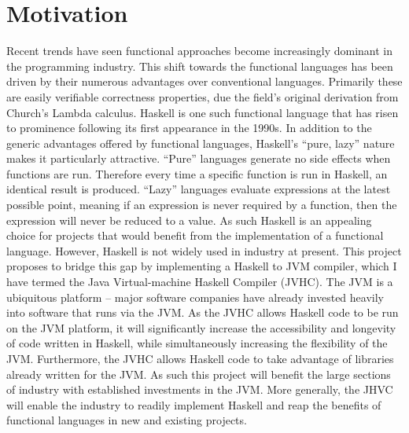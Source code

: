 \documentclass[float=false, crop=false]{standalone}
\begin{document}
\section{Motivation}

Recent trends have seen functional approaches become increasingly dominant in the programming industry. This shift towards the functional languages has been driven by their numerous advantages over conventional languages.  Primarily these are easily verifiable correctness properties, due the field's original derivation from Church's Lambda calculus.  Haskell is one such functional language that has risen to prominence following its first appearance in the 1990s. In addition to the generic
advantages offered by functional languages, Haskell’s ``pure, lazy'' nature makes it particularly attractive. ``Pure'' languages generate no side effects when functions are run. Therefore every time a specific function is run in Haskell, an identical result is produced. ``Lazy'' languages evaluate expressions at the latest possible point, meaning if an expression is never required by a function, then the expression will never be reduced to a value. As such Haskell is an appealing choice for
projects that would benefit from the implementation of a functional language. However, Haskell is not widely used in industry at present. This project proposes to bridge this gap by implementing a Haskell to JVM compiler, which I have termed the Java Virtual-machine Haskell Compiler (JVHC). The JVM is a ubiquitous platform -- major software companies have already invested heavily into software that runs via the JVM. As the JVHC allows Haskell code to be run on the JVM platform, it will significantly increase the accessibility and longevity of code written in Haskell, while simultaneously increasing the flexibility of the JVM. Furthermore, the JVHC allows Haskell code to take advantage of libraries already written for the JVM. As such this project will benefit the large sections of industry with established investments in the JVM. More generally, the JHVC will enable the industry to readily implement Haskell and reap the benefits of functional languages in new and existing projects.


\end{document}
